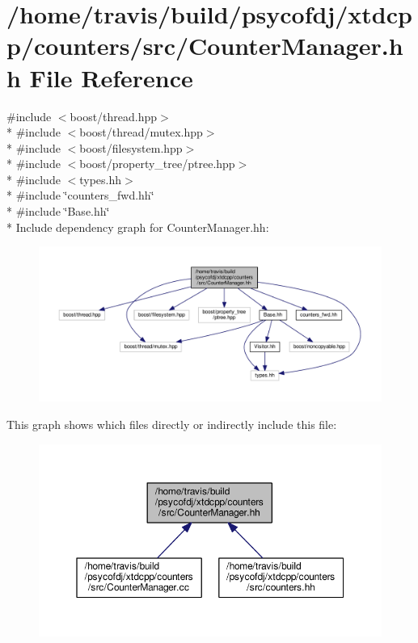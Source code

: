 \hypertarget{CounterManager_8hh}{\section{/home/travis/build/psycofdj/xtdcpp/counters/src/\-Counter\-Manager.hh File Reference}
\label{CounterManager_8hh}
}
{\ttfamily \#include $<$boost/thread.\-hpp$>$}\\*
{\ttfamily \#include $<$boost/thread/mutex.\-hpp$>$}\\*
{\ttfamily \#include $<$boost/filesystem.\-hpp$>$}\\*
{\ttfamily \#include $<$boost/property\-\_\-tree/ptree.\-hpp$>$}\\*
{\ttfamily \#include $<$types.\-hh$>$}\\*
{\ttfamily \#include \char`\"{}counters\-\_\-fwd.\-hh\char`\"{}}\\*
{\ttfamily \#include \char`\"{}Base.\-hh\char`\"{}}\\*
Include dependency graph for Counter\-Manager.\-hh\-:
\nopagebreak
\begin{figure}[H]
\begin{center}
\leavevmode
\includegraphics[width=350pt]{CounterManager_8hh__incl}
\end{center}
\end{figure}
This graph shows which files directly or indirectly include this file\-:
\nopagebreak
\begin{figure}[H]
\begin{center}
\leavevmode
\includegraphics[width=350pt]{CounterManager_8hh__dep__incl}
\end{center}
\end{figure}
